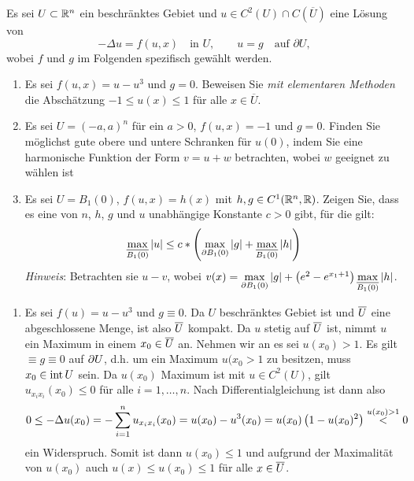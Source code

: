 \begin{exercisePage}
	
	\setcounter{taskcount}{14}
	
	\begin{task}
		Es sei $U \subset \mathbb{R}^n$ ein beschränktes Gebiet und $u \in C^2(U)\cap C(\overline U)$ eine Lösung von
		$$-\Delta u = f(u,x)\quad\text{in }U,\qquad u = g \quad\text{auf }\partial U,$$
		wobei $f$ und $g$ im Folgenden spezifisch gewählt werden.
		\begin{enumerate}
			\item Es sei $f(u,x) = u-u^3$ und $g=0$. Beweisen Sie \emph{mit elementaren Methoden} die Abschätzung $-1\leq u(x)\leq 1$ für alle $x\in \overline{U}$.
			
			\item Es sei $U = (-a,a)^n$ für ein $a>0$, $f(u,x) = -1$ und $g=0$. Finden Sie möglichst gute obere und untere Schranken für $u(0)$, indem Sie eine harmonische Funktion der Form $v=u+w$ betrachten, wobei $w$ geeignet zu wählen ist
			
			\item Es sei $U = B_1(0)$, $f(u,x) = h(x)$ mit $h,g \in C^1(\mathbb{R}^n,\mathbb{R})$. Zeigen Sie, dass es eine von $n$, $h$, $g$ und $u$ unabhängige Konstante $c>0$ gibt, für die gilt:
			\begin{equation*}
				\max_{\overline{B_1(0)}} |u| \leq c * \left( \max_{\partial B_1(0)} |g| +\max_{\overline{B_1(0)}} |h| \right)
			\end{equation*}		
			\emph{Hinweis}: Betrachten sie $u-v$, wobei
			$v(x)=\max\limits_{\partial B_1(0)} |g| + \left(e^2 - e^{x_1+1} \right) \max\limits_{\overline{B_1(0)}} |h|$.
		\end{enumerate}
	\end{task}

	\begin{enumerate}[label=(zu \alph*), leftmargin=*]
		\item Es sei $f(u) = u - u^3$ und $g \equiv 0$. Da $U$ beschränktes Gebiet ist und $\overline{U}$ eine abgeschlossene Menge, ist also $\overline{U}$ kompakt. Da $u$ stetig auf $\overline{U}$ ist, nimmt $u$ ein Maximum in einem $x_0 \in \overline{U}$ an. Nehmen wir an es sei $u(x_0) > 1$. Es gilt $ \equiv g \equiv 0$ auf $\partial U$, d.h. um ein Maximum $u(x_0 > 1$ zu besitzen, muss $x_0 \in \operatorname{int} U$ sein. Da $u(x_0)$ Maximum ist mit $u \in C^2(U)$, gilt $u_{x_i x_i}(x_0) \le 0$ für alle $i=1, \dots, n$. Nach Differentialgleichung ist dann also
		\begin{equation*}
			0 \le - \Delta u(x_0) =  - \sum_{i=1}^n u_{x_i x_i} (x_0) = u(x_0) - u^3(x_0) = u(x_0) \left( 1 - u(x_0)^2 \right) \overset{u(x_0) > 1}{<} 0
		\end{equation*}
		ein Widerspruch. Somit ist dann $u(x_0) \le 1$ und aufgrund der Maximalität von $u(x_0)$ auch $u(x) \le u(x_0) \le 1$ für alle $x \in \overline{U}$.
		

\end{enumerate}
\end{exercisePage}

